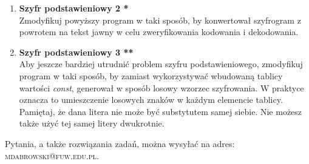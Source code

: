 \documentclass[12pt]{article}
\begin{document}
\begin{enumerate}
\item \textbf{Szyfr podstawieniowy 2 *}\\
Zmodyfikuj powyższy program w taki sposób, by konwertował szyfrogram z powrotem na tekst jawny w celu zweryfikowania kodowania i dekodowania.

\item \textbf{Szyfr podstawieniowy 3 **}\\
Aby jeszcze bardziej utrudnić problem szyfru podstawieniowego, zmodyfikuj program w taki sposób, by zamiast wykorzystywać wbudowaną tablicy wartości \textit{const}, generował w sposób losowy wzorzec szyfrowania. W praktyce oznacza to umieszczenie losowych znaków w każdym elemencie tablicy. Pamiętaj, że dana litera nie może być substytutem samej siebie. Nie możesz także użyć tej samej litery dwukrotnie.

\end{enumerate}
\vspace{1cm}
\small Pytania, a także rozwiązania zadań, można wysyłać na adres: \textsc{mdabrowski@fuw.edu.pl}.
\end{document}
